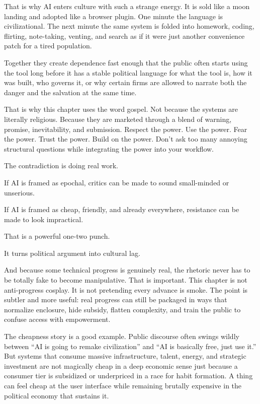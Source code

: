 \documentclass[
  american,
  12pt,
  letterpaper,
]{article}
\begin{document}
That is why AI enters culture with such a strange energy. It is sold
like a moon landing and adopted like a browser plugin. One minute the
language is civilizational. The next minute the same system is folded
into homework, coding, flirting, note-taking, venting, and search as if
it were just another convenience patch for a tired population.

Together they create dependence fast enough that the public often starts
using the tool long before it has a stable political language for what
the tool is, how it was built, who governs it, or why certain firms are
allowed to narrate both the danger and the salvation at the same time.

That is why this chapter uses the word gospel. Not because the systems
are literally religious. Because they are marketed through a blend of
warning, promise, inevitability, and submission. Respect the power. Use
the power. Fear the power. Trust the power. Build on the power. Don't
ask too many annoying structural questions while integrating the power
into your workflow.

The contradiction is doing real work.

If AI is framed as epochal, critics can be made to sound small-minded or
unserious.

If AI is framed as cheap, friendly, and already everywhere, resistance
can be made to look impractical.

That is a powerful one-two punch.

It turns political argument into cultural lag.

And because some technical progress is genuinely real, the rhetoric
never has to be totally fake to become manipulative. That is important.
This chapter is not anti-progress cosplay. It is not pretending every
advance is smoke. The point is subtler and more useful: real progress
can still be packaged in ways that normalize enclosure, hide subsidy,
flatten complexity, and train the public to confuse access with
empowerment.

The cheapness story is a good example. Public discourse often swings
wildly between ``AI is going to remake civilization'' and ``AI is
basically free, just use it.'' But systems that consume massive
infrastructure, talent, energy, and strategic investment are not
magically cheap in a deep economic sense just because a consumer tier is
subsidized or underpriced in a race for habit formation. A thing can
feel cheap at the user interface while remaining brutally expensive in
the political economy that sustains it.
\end{document}
